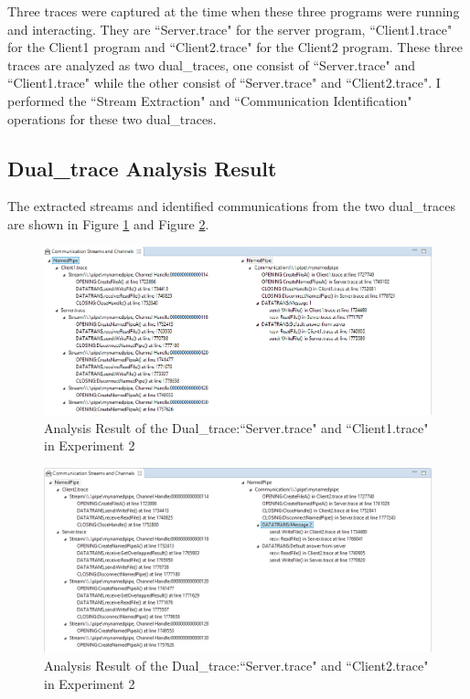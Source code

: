 Three traces were captured at the time when these three programs were running and interacting. They are ``Server.trace" for the server program, ``Client1.trace" for the Client1 program and ``Client2.trace" for the Client2 program. These three traces are analyzed as two dual\_traces, one consist of ``Server.trace" and ``Client1.trace" while the other consist of ``Server.trace" and ``Client2.trace". I performed the ``Stream Extraction" and ``Communication Identification" operations for these two dual\_traces. 

\subsection{Dual\_trace Analysis Result}
The extracted streams and identified communications from the two dual\_traces are shown in Figure \ref{result21} and Figure \ref{result22}.

\begin{figure}[H]
\centerline{\includegraphics[scale=0.55]{Figures/result21}}
 \caption{Analysis Result of the Dual\_trace:``Server.trace" and ``Client1.trace" in Experiment 2}
\label{result21}
\end{figure}

\begin{figure}[H]
\centerline{\includegraphics[scale=0.55]{Figures/result22}}
 \caption{Analysis Result of the Dual\_trace:``Server.trace" and ``Client2.trace" in Experiment 2}
\label{result22}
\end{figure}



